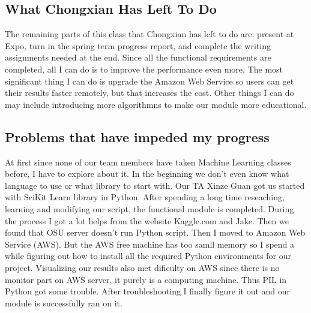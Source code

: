 \documentclass[onecolumn, draftclsnofoot,10pt, compsoc]{IEEEtran}
\begin{document}
\subsection{What Chongxian Has Left To Do}
The remaining parts of this class that Chongxian has left to do are: present at Expo, turn in the spring term progress report, and complete the writing assignments needed at the end. Since all the functional requirements are completed, all I can do is to improve the performance even more. The most significant thing I can do is upgrade the Amazon Web Service so users can get their results faster remotely, but that increases the cost. Other things I can do may include introducing more algorithmns to make our module more educational.

\subsection{Problems that have impeded my progress}
At first since none of our team members have taken Machine Learning classes before, I have to explore about it. In the beginning we don't even know what language to use or what library to start with. Our TA Xinze Guan got us started with SciKit Learn library in Python. After spending a long time reseaching, learning and modifying our script, the functional module is completed. During the process I got a lot helps from the website Kaggle.com and Jake. Then we found that OSU server doesn't run Python script. Then I moved to Amazon Web Service (AWS). But the AWS free machine has too samll memory so I spend a while figuring out how to install all the required Python environments for our project. 
Visualizing our results also met dificulty on AWS since there is no monitor part on AWS server, it purely is a computing machine. Thus PIL in Python got some trouble. After troubleshooting I finally figure it out and our module is successfully ran on it. 
\end{document}
